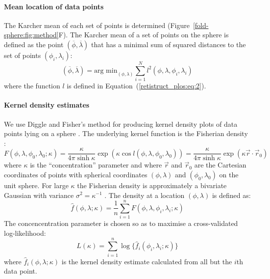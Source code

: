 \documentclass[10pt]{article}
\begin{document}
\paragraph{Mean location of data points}
\label{retistruct_plos:sec:mean-location-data}

The Karcher mean of each set of points is determined
(Figure~\ref{fold-sphere:fig:method}F). The Karcher mean of a set of
points on the sphere \cite{Karc77riem,HeoSmal06form} is defined as the
point $(\overline{\phi}, \overline{\lambda})$ that has a minimal sum
of squared distances to the set of points $(\phi_i, \lambda_i)$:
\begin{equation}
  \label{retistruct_plos:eq:3}
  (\overline{\phi}, \overline{\lambda}) = \mbox{arg min}_{(\phi,
    \lambda)} \sum_{i=1}^N l^2(\phi, \lambda, \phi_i, \lambda_i)
\end{equation}
where the function $l$ is defined in
Equation~(\ref{retistruct_plos:eq:2}).

\paragraph{Kernel density estimates}
\label{retistruct_plos:sec:kern-dens-estim}

We use Diggle and Fisher's method for producing kernel density plots
of data points lying on a sphere \cite{DiggFish85sphe}. The underlying kernel
function is the Fisherian density \cite{Fish53disp}:
\begin{equation}
  \label{kernel-density:eq:3}
  F(\phi, \lambda, \phi_0, \lambda_0; \kappa) = \frac{\kappa}{4\pi\sinh \kappa}
  \exp(\kappa\cos l(\phi, \lambda, \phi_0, \lambda_0)) 
= \frac{\kappa}{4\pi\sinh \kappa}\exp(\kappa\vec{r}\cdot\vec{r}_0)
\end{equation}
where $\kappa$ is the ``concentration'' parameter and where $\vec{r}$ and
$\vec{r}_0$ are the Cartesian coordinates of points with spherical
coordinates $(\phi, \lambda)$ and $(\phi_0, \lambda_0)$ on the unit
sphere. For large $\kappa$ the Fisherian density is approximately a
bivariate Gaussian with variance $\sigma^2=\kappa^{-1}$
\cite{DiggFish85sphe}. The density at a location $(\phi,\lambda)$ is
defined as:
\begin{equation}
  \hat f(\phi,\lambda;\kappa) = \frac{1}{n} \sum_{i=1}^n F(\phi, \lambda, \phi_i, \lambda_i; \kappa)
\end{equation}
The concencentration parameter is chosen so as to maximise a
cross-validated log-likelihood:
\begin{equation}
  \label{kernel-density:eq:2}
  L(\kappa) = \sum_{i=1}^n \log\{\hat f_{i}(\phi_i, \lambda_i;\kappa)\}
\end{equation}
where $\hat f_{i}(\phi, \lambda;\kappa)$ is the kernel density estimate
calculated from all but the $i$th data point.
\end{document}
